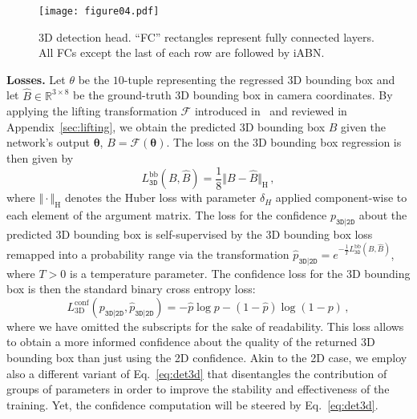 \documentclass[10pt,twocolumn,letterpaper]{article}
\newcommand{\vct}[1]{\ensuremath{\boldsymbol{#1}}}
\newcommand{\set}[1]{\ensuremath{\mathcal{#1}}}
\newcommand{\iABN}{iABN\xspace}
\renewcommand{\paragraph}[1]{

        \vspace{3pt}
	\noindent\textbf{#1}}
\begin{document}
\begin{figure}
    \centering
    \texttt{[image: figure04.pdf]}
    \caption{3D detection head. ``FC'' rectangles represent fully connected layers. All FCs except the last of each row are followed by \iABN.}
    \label{fig:head3d}
    \vspace{-12pt}
\end{figure}

\paragraph{Losses.}
Let $\theta$ be the $10$-tuple representing the regressed 3D bounding box and let $\hat B\in\mathbb R^{3\times 8}$ be the ground-truth 3D bounding box in camera coordinates.
By applying the lifting transformation $\set F$ introduced in~\cite{Manhardt_2019_CVPR} and reviewed in Appendix~\ref{sec:lifting}, we obtain the predicted 3D bounding box $B$ given the network's output $\vct \theta$, \ie $B=\set F(\vct \theta)$.
The loss on the 3D bounding box regression is then given by
\begin{equation}\label{eq:det3d}
L_\mathtt{3D}^\text{bb}(B, \hat B)=\frac{1}{8}\Vert B-\hat B\Vert_\text{H}\,,    
\end{equation}
where $\Vert\cdot\Vert_\text{H}$ denotes the Huber loss with parameter $\delta_H$ applied component-wise to each element of the argument matrix.
The loss for the confidence $p_\mathtt{3D|2D}$ about the predicted 3D bounding box is self-supervised by the 3D bounding box loss remapped into a probability range via the transformation $\hat p_\mathtt{3D|2D}=e^{-\frac{1}{T}L_\mathtt{3D}^\text{bb}(B, \hat B)}$, where $T>0$ is a temperature parameter. The confidence loss for the 3D bounding box is then the standard binary cross entropy loss:
\[
L_\text{3D}^\text{conf}(p_\mathtt{3D|2D}, \hat p_\mathtt{3D|2D})=-\hat p\log p -(1-\hat p)\log(1-p)\,,
\]
where we have omitted the subscripts for the sake of readability. This loss allows to obtain a more informed confidence about the quality of the returned 3D bounding box than just using the 2D confidence.
Akin to the 2D case, we employ also a different variant of Eq.~\eqref{eq:det3d} that disentangles the contribution of groups of parameters in order to improve the stability and effectiveness of the training. Yet, the confidence computation 
will be steered by Eq.~\eqref{eq:det3d}.
\end{document}
